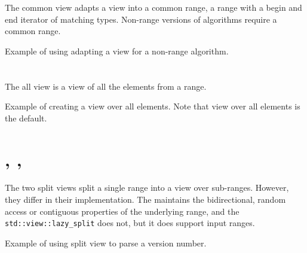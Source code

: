 The common view adapts a view into a common range, a range with a begin and end iterator of matching types. Non-range versions of algorithms require a common range.

\begin{codebox}[]{\href{https://compiler-explorer.com/z/WbGrGK56z}{\ExternalLink}}
\footnotesize Example of using adapting a view for a non-range algorithm.
\tcblower
{}
\end{codebox}

\section{\texorpdfstring{}{\texttt{std::views::all}}}

The all view is a view of all the elements from a range.

\begin{codebox}[]{\href{https://compiler-explorer.com/z/1hf9ajK81}{\ExternalLink}}
\footnotesize Example of creating a view over all elements. Note that view over all elements is the default.
\tcblower
{}
\end{codebox}

\section{\texorpdfstring{, , \newline{}}{\texttt{std::views::split}, \texttt{std::views::lazy\_split}, \textCR\texttt{std::views::join\_view}}}

The two split views split a single range into a view over sub-ranges. However, they differ in their implementation.
The  maintains the bidirectional, random access or contiguous properties of the underlying range, and the \texttt{std::view::\-lazy\_split} does not, but it does support input ranges.

\begin{codebox}[breakable]{\href{https://compiler-explorer.com/z/cjxdMjYhr}{\ExternalLink}}
\footnotesize Example of using split view to parse a version number.
\tcblower
{}
\end{codebox}

